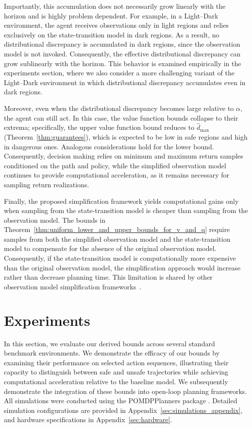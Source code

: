 \documentclass[acmlarge, manuscript, screen, review, natbib=false, oneside]{acmart}
\begin{document}
Importantly, this accumulation does not necessarily grow linearly with the horizon and is highly problem dependent. For example, in a Light–Dark environment, the agent receives observations only in light regions and relies exclusively on the state-transition model in dark regions. As a result, no distributional discrepancy is accumulated in dark regions, since the observation model is not invoked. Consequently, the effective distributional discrepancy can grow sublinearly with the horizon. This behavior is examined empirically in the experiments section, where we also consider a more challenging variant of the Light–Dark environment in which distributional discrepancy accumulates even in dark regions.

Moreover, even when the distributional discrepancy becomes large relative to $\alpha$, the agent can still act. In this case, the value function bounds collapse to their extrema; specifically, the upper value function bound reduces to $\hat{d}_{\max}$ (Theorem~\ref{thm:guarantees}), which is expected to be low in safe regions and high in dangerous ones. Analogous considerations hold for the lower bound. Consequently, decision making relies on minimum and maximum return samples conditioned on the path and policy, while the simplified observation model continues to provide computational acceleration, as it remains necessary for sampling return realizations.

Finally, the proposed simplification framework yields computational gains only when sampling from the state-transition model is cheaper than sampling from the observation model. The bounds in Theorem~\ref{thm:uniform_lower_and_upper_bounds_for_v_and_q} require samples from both the simplified observation model and the state-transition model to compensate for the absence of the original observation model. Consequently, if the state-transition model is computationally more expensive than the original observation model, the simplification approach would increase rather than decrease planning time. This limitation is shared by other observation model simplification frameworks~\cite{LevYehudi24aaai}.

\section{Experiments}
In this section, we evaluate our derived bounds across several standard benchmark environments. We demonstrate the efficacy of our bounds by examining their performance on selected action sequences, illustrating their capacity to distinguish between safe and unsafe trajectories while achieving computational acceleration relative to the baseline model. We subsequently demonstrate the integration of these bounds into open-loop planning frameworks. All simulations were conducted using the POMDPPlanners package \cite{pariente2026pomdpplannersopensourcepackagepomdp}. Detailed simulation configurations are provided in Appendix~\ref{sec:simulations_appendix}, and hardware specifications in Appendix~\ref{sec:hardware}.
\end{document}
